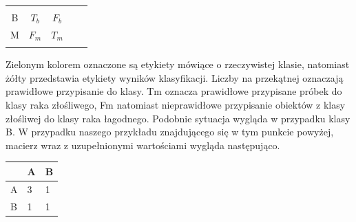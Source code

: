 \documentclass[12pt]{article}
\begin{document}
\begin{table}[H]
\begin{center}
\begin{LARGE}

\begin{tabular}{cccll}
\cline{1-3}
\multicolumn{1}{|c|}{}                          & \multicolumn{1}{c|}{\cellcolor[HTML]{FCFF2F}{\color[HTML]{333333} B}} & \multicolumn{1}{c|}{\cellcolor[HTML]{FCFF2F}{\color[HTML]{333333} M}} &  &  \\ \cline{1-3}
\multicolumn{1}{|c|}{\cellcolor[HTML]{34FF34}B} & \multicolumn{1}{c|}{$T_{b}$}                                               & \multicolumn{1}{c|}{$F_{b}$}                                               &  &  \\ \cline{1-3}
\multicolumn{1}{|c|}{\cellcolor[HTML]{34FF34}M} & \multicolumn{1}{c|}{$F_{m}$}                                               & \multicolumn{1}{c|}{$T_{m}$}                                               &  &  \\ \cline{1-3}
                                                &                                                                       &                                                                       &  & 
\end{tabular}
\end{LARGE}
\end{center}
\end{table}

Zielonym kolorem oznaczone są etykiety mówiące o rzeczywistej klasie, natomiast żółty przedstawia etykiety wyników klasyfikacji. Liczby na przekątnej oznaczają prawidłowe przypisanie do klasy. Tm oznacza prawidłowe przypisane próbek do klasy raka złośliwego, Fm natomiast nieprawidłowe przypisanie obiektów z klasy złośliwej do klasy raka łagodnego. Podobnie sytuacja wygląda w przypadku klasy B. W przypadku naszego przykładu znajdującego się w tym punkcie powyżej, macierz wraz z uzupełnionymi wartościami wygląda następująco.

\begin{table}[H]
\begin{center}
\begin{LARGE}
\begin{tabular}{l|l|l|}
\cline{2-3}
                        & A & B \\ \hline
\multicolumn{1}{|l|}{A} & 3 & 1 \\ \hline
\multicolumn{1}{|l|}{B} & 1 & 1 \\ \hline
\end{tabular}
\end{LARGE}
\end{center}
\end{table}
\end{document}
